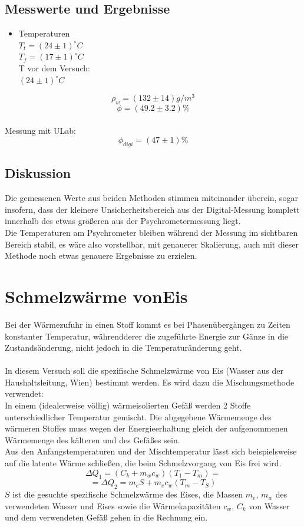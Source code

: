 \documentclass[12pt,a4paper]{article}
\begin{document}
\begin{multicols}{2}
\subsection{Messwerte und Ergebnisse}
\begin {itemize}
	\item Temperaturen\\
	$T_{t} = (24 \pm 1)^{\circ}C$\\
	$T_{f} = (17 \pm 1)^{\circ}C$\\
	T vor dem Versuch:\\
	$(24 \pm 1)^{\circ}C$\\
\end{itemize}

$$\rho_w= (132 \pm 14)g/m^3$$
$$\phi =(49.2\pm 3.2)\%$$
\\
Messung mit ULab:
$$\phi_{digi}=(47 \pm 1)\%$$

\subsection{Diskussion}

Die gemessenen Werte aus beiden Methoden stimmen miteinander überein, sogar insofern, dass der kleinere Unsicherheitsbereich aus der Digital-Messung komplett innerhalb des etwas größeren aus der Psychrometermessung liegt.\\
Die Temperaturen am Psychrometer bleiben während der Messung im sichtbaren Bereich stabil, es wäre also vorstellbar, mit genauerer Skalierung, auch mit dieser Methode noch etwas genauere Ergebnisse zu erzielen.\\



\section{Schmelzwärme vonEis}
Bei der Wärmezufuhr in einen Stoff kommt es bei Phasenübergängen zu Zeiten konstanter Temperatur, währendderer die zugeführte Energie zur Gänze in die Zustandsänderung, nicht jedoch in die Temperaturänderung geht.\\
\\
In diesem Versuch soll die spezifische Schmelzwärme von Eis (Wasser aus der Haushaltsleitung, Wien) bestimmt werden. Es wird dazu die Mischungsmethode verwendet:\\
In einem (idealerweise völlig) wärmeisolierten Gefäß werden 2 Stoffe unterschiedlicher Temperatur gemischt. Die abgegebene Wärmemenge des wärmeren Stoffes muss wegen der Energieerhaltung gleich der aufgenommenen Wärmemenge des kälteren und des Gefäßes sein.\\
Aus den Anfangstemperaturen und der Mischtemperatur lässt sich beispielsweise auf die latente Wärme schließen, die beim Schmelzvorgang von Eis frei wird.
$$\Delta Q_1=(C_k+m_wc_w)(T_1-T_m)=$$
$$=\Delta Q_2 = m_eS+m_ec_w(T_m-T_S)$$
$S$ ist die gesuchte spezifische Schmelzwärme des Eises, die Massen $m_e$, $m_w$ des verwendeten Wasser und Eises sowie die Wärmekapazitäten $c_w$, $C_k$ von Wasser und dem verwendeten Gefäß gehen in die Rechnung ein.\\


\end{multicols}
\end{document}
